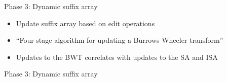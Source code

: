 \documentclass[aspectratio=1610, xcolor=table]{beamer}
\begin{document}
\begin{frame}{Phase 3: Dynamic suffix array}
    \begin{itemize}
        \item Update suffix array based on edit operations
        \item ``Four-stage algorithm for updating a Burrows-Wheeler transform''
        \item Updates to the BWT correlates with updates to the SA and ISA
    \end{itemize}
\end{frame}

\begin{frame}[fragile]{Phase 3: Dynamic suffix array}
	\begin{table}
		\begin{center}
			\hspace{0.5cm}
\end{center}
\end{table}
\end{frame}
\end{document}
